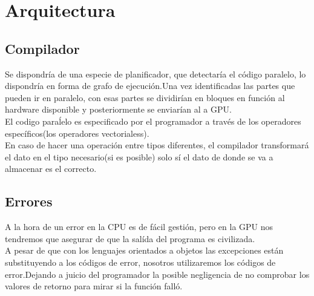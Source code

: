\documentclass[12pt,a4paper]{article}
\begin{document}
\section{Arquitectura}
\subsection{Compilador}
Se dispondría de una especie de planificador, que detectaría el código paralelo,
lo dispondría en forma de grafo de ejecución.Una vez identificadas las partes
que pueden ir en paralelo, con esas partes se dividirían en bloques en función
al hardware disponible y posteriormente se enviarían al a GPU.\\
El codigo paraĺelo es especificado por el programador a través de los operadores
específicos(los operadores vectorialess).\\
En caso de hacer una operación entre tipos diferentes, el compilador
transformará el dato en el tipo necesario(si es posible) solo sí el dato de
donde se va a almacenar es el correcto.
\subsection{Errores}
A la hora de un error en la CPU es de fácil gestión, pero en la GPU nos
tendremos que asegurar de que la salída del programa es civilizada.\\
A pesar de que con los lenguajes orientados a objetos las excepciones están substituyendo a los códigos de error, nosotros utilizaremos los códigos de error.Dejando a juicio del programador la posible negligencia de no comprobar los valores de retorno para mirar si la función falló.
\end{document}
